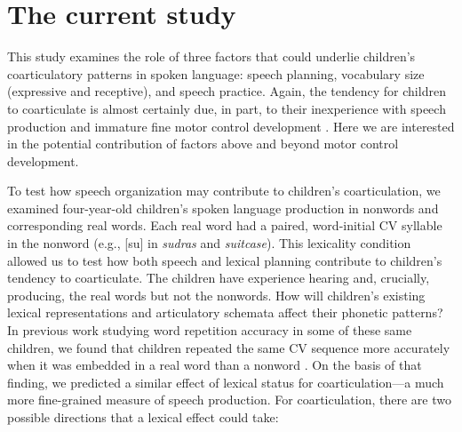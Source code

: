 \documentclass[a4paper,man,natbib,donotrepeattitle, apacite]{apa6}
\begin{document}
\section{The current study}

This study examines the role of three factors that could underlie children’s coarticulatory patterns in spoken language: speech planning, vocabulary size (expressive and receptive), and speech practice. Again, the tendency for children to coarticulate is almost certainly due, in part, to their inexperience with speech production and immature fine motor control development \cite{barbierWhatAnticipatoryCoarticulation2020,goffmanRelationsSegmentalMotor2007,greenPhysiologicDevelopmentSpeech2000,rubertusDevelopmentGesturalOrganization2018,zharkovaDynamicsVoicelessSibilant2018}. Here we are interested in the potential contribution of factors above and beyond motor control development.

To test how speech organization may contribute to children’s coarticulation, we examined four-year-old children’s spoken language production in nonwords and corresponding real words. Each real word had a paired, word-initial CV syllable in the nonword (e.g., [su] in \textit{sudras} and \textit{suitcase}). This lexicality condition allowed us to test how both speech and lexical planning contribute to children’s tendency to coarticulate. The children have experience hearing and, crucially, producing, the real words but not the nonwords. How will children’s existing lexical representations and articulatory schemata affect their phonetic patterns? In previous work studying word repetition accuracy in some of these same children, we found that children repeated the same CV sequence more accurately when it was embedded in a real word than a nonword \cite{cychoszLexicalAdvantageFouryearold2020}. On the basis of that finding, we predicted a similar effect of lexical status for coarticulation---a much more fine-grained measure of speech production. For coarticulation, there are two possible directions that a lexical effect could take: 
\end{document}
